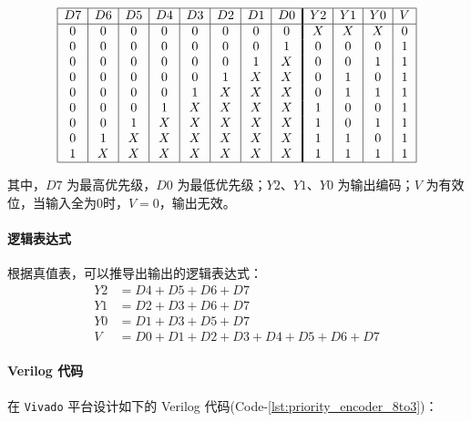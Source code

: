 \documentclass[10pt,a4paper,twoside]{rho-class/rho}
\begin{document}
        \[
        \begin{array}{|c|c|c|c|c|c|c|c!{\vrule width 1.4pt}c|c|c|c|}
        \hline
        D7 & D6 & D5 & D4 & D3 & D2 & D1 & D0 & Y2 & Y1 & Y0 & V \\
        \hline
        0 & 0 & 0 & 0 & 0 & 0 & 0 & 0 & X & X & X & 0 \\
        0 & 0 & 0 & 0 & 0 & 0 & 0 & 1 & 0 & 0 & 0 & 1 \\
        0 & 0 & 0 & 0 & 0 & 0 & 1 & X & 0 & 0 & 1 & 1 \\
        0 & 0 & 0 & 0 & 0 & 1 & X & X & 0 & 1 & 0 & 1 \\
        0 & 0 & 0 & 0 & 1 & X & X & X & 0 & 1 & 1 & 1 \\
        0 & 0 & 0 & 1 & X & X & X & X & 1 & 0 & 0 & 1 \\
        0 & 0 & 1 & X & X & X & X & X & 1 & 0 & 1 & 1 \\
        0 & 1 & X & X & X & X & X & X & 1 & 1 & 0 & 1 \\
        1 & X & X & X & X & X & X & X & 1 & 1 & 1 & 1 \\
        \hline
        \end{array}
        \]
        
        其中，$D7$ 为最高优先级，$D0$ 为最低优先级；$Y2$、$Y1$、$Y0$ 为输出编码；$V$ 为有效位，当输入全为0时，$V=0$，输出无效。
        
        \paragraph{逻辑表达式}
        
        根据真值表，可以推导出输出的逻辑表达式：
            \begin{align*}
            Y2 &= D4 + D5 + D6 + D7 \\
            Y1 &= D2 + D3 + D6 + D7 \\
            Y0 &= D1 + D3 + D5 + D7 \\
            V &= D0 + D1 + D2 + D3 + D4 + D5 + D6 + D7
            \end{align*}
        
        
        \paragraph{Verilog 代码}
        
        在 \verb|Vivado| 平台设计如下的 Verilog 代码(Code-\ref{lst:priority_encoder_8to3})：
                
\end{document}
